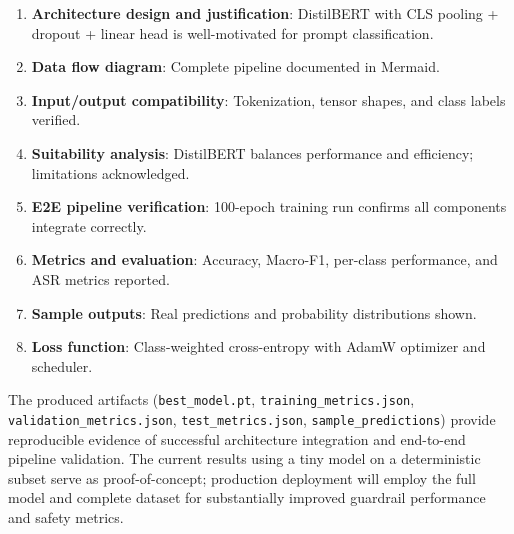 \documentclass[11pt]{article}
\begin{document}
\begin{enumerate}[leftmargin=*]
\item \textbf{Architecture design and justification}: DistilBERT with CLS pooling + dropout + linear head is well-motivated for prompt classification.
\item \textbf{Data flow diagram}: Complete pipeline documented in Mermaid.
\item \textbf{Input/output compatibility}: Tokenization, tensor shapes, and class labels verified.
\item \textbf{Suitability analysis}: DistilBERT balances performance and efficiency; limitations acknowledged.
\item \textbf{E2E pipeline verification}: 100-epoch training run confirms all components integrate correctly.
\item \textbf{Metrics and evaluation}: Accuracy, Macro-F1, per-class performance, and ASR metrics reported.
\item \textbf{Sample outputs}: Real predictions and probability distributions shown.
\item \textbf{Loss function}: Class-weighted cross-entropy with AdamW optimizer and scheduler.
\end{enumerate}

The produced artifacts (\texttt{best\_model.pt}, \texttt{training\_metrics.json}, \texttt{validation\_metrics.json}, \texttt{test\_metrics.json}, \texttt{sample\_predictions}) provide reproducible evidence of successful architecture integration and end-to-end pipeline validation. The current results using a tiny model on a deterministic subset serve as proof-of-concept; production deployment will employ the full model and complete dataset for substantially improved guardrail performance and safety metrics.
\end{document}
